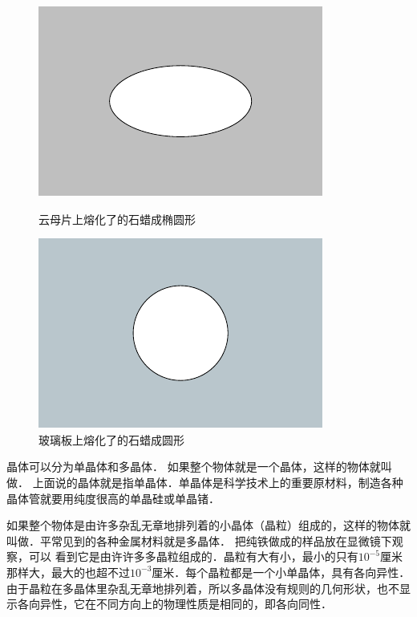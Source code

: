 \begin{figure}[htbp]
    \centering
    \begin{minipage}{0.47\linewidth}
    	\centering
    	\includegraphics{fig/B/4-2.pdf}
    	\caption{云母片上熔化了的石蜡成椭圆形}\label{fig_B_4-2}
    \end{minipage}
    \hfill
    \begin{minipage}{0.47\linewidth}
    	\centering
    	\includegraphics{fig/B/4-3.pdf}
    	\caption{玻璃板上熔化了的石蜡成圆形}\label{fig_B_4-3}
    \end{minipage}
\end{figure}


晶体可以分为单晶体和多晶体．
如果整个物体就是一个晶体，这样的物体就叫做．
上面说的晶体就是指单晶体．单晶体是科学技术上的重要原材料，制造各种晶体管就要用纯度很高的单晶硅或单晶锗．

如果整个物体是由许多杂乱无章地排列着的小晶体（晶粒）组成的，这样的物体就叫做．平常见到的各种金属材料就是多晶体．
把纯铁做成的样品放在显微镜下观察，可以
看到它是由许许多多晶粒组成的．晶粒有大有小，最小的只有$10^{-5}$厘米那样大，最大的也超不过$10^{-3}$厘米．每个晶粒都是一个小单晶体，具有各向异性．由于晶粒在多晶体里杂乱无章地排列着，所以多晶体没有规则的几何形状，也不显示各向异性，它在不同方向上的物理性质是相同的，即各向同性．

